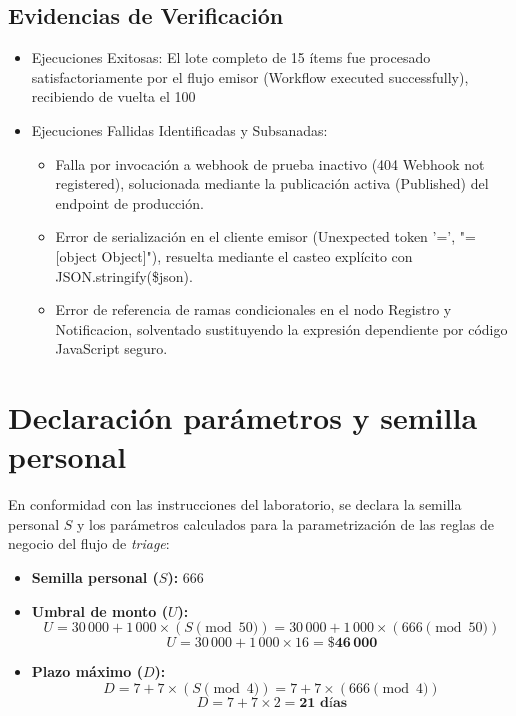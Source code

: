\documentclass[11pt,letterpaper]{article}
\begin{document}
\subsection{Evidencias de Verificación}
\begin{itemize}
    \item Ejecuciones Exitosas: El lote completo de 15 ítems fue procesado satisfactoriamente por el flujo emisor (Workflow executed successfully), recibiendo de vuelta el 100%
    \item Ejecuciones Fallidas Identificadas y Subsanadas:
    \begin{itemize}
        \item Falla por invocación a webhook de prueba inactivo (404 Webhook not registered), solucionada mediante la publicación activa (Published) del endpoint de producción.
        \item Error de serialización en el cliente emisor (Unexpected token '=', "=[object Object]"), resuelta mediante el casteo explícito con JSON.stringify(\$json).
        \item Error de referencia de ramas condicionales en el nodo Registro y Notificacion, solventado sustituyendo la expresión dependiente por código JavaScript seguro.
    \end{itemize}
\end{itemize}

\newpage
\section{Declaración parámetros y semilla personal}

En conformidad con las instrucciones del laboratorio, se declara la semilla personal $S$ y los parámetros calculados para la parametrización de las reglas de negocio del flujo de \textit{triage}:

\begin{itemize}
    \item \textbf{Semilla personal ($S$):} $666$
    \item \textbf{Umbral de monto ($U$):}
    \[
    U = 30\,000 + 1\,000 \times (S \pmod{50}) = 30\,000 + 1\,000 \times (666 \pmod{50})
    \]
    \[
    U = 30\,000 + 1\,000 \times 16 = \mathbf{\$46\,000}
    \]
    \item \textbf{Plazo máximo ($D$):}
    \[
    D = 7 + 7 \times (S \pmod{4}) = 7 + 7 \times (666 \pmod{4})
    \]
    \[
    D = 7 + 7 \times 2 = \mathbf{21\text{ días}}
    \]
\end{itemize}
\end{document}
